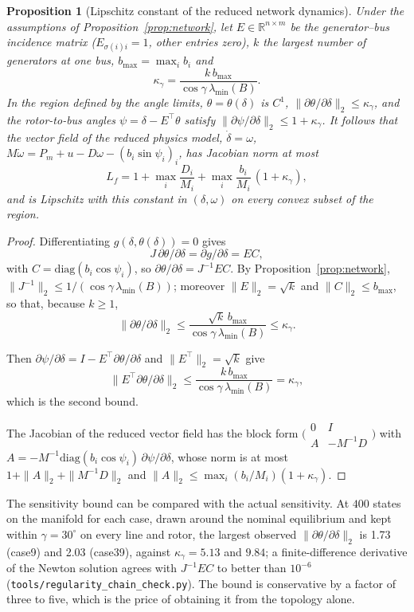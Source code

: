 \documentclass[preprint,12pt]{elsarticle}
\newtheorem{proposition}{Proposition}
\newcommand{\RR}{\mathbb{R}}
\newcommand{\chainA}{1.73}
\newcommand{\chainB}{2.03}
\newcommand{\chainC}{5.13}
\newcommand{\chainD}{9.84}
\begin{document}
\begin{proposition}[Lipschitz constant of the reduced network dynamics]
\label{prop:lip}
Under the assumptions of Proposition~\ref{prop:network}, let $E\in\RR^{n\times m}$ be the generator--bus incidence matrix ($E_{\sigma(i)i}=1$, other entries zero), $k$ the largest number of generators at one bus, $b_{\max}=\max_i b_i$ and
\begin{equation}
\kappa_\gamma=\frac{k\,b_{\max}}{\cos\gamma\,\lambda_{\min}(B)} .
\label{eq:kappa}
\end{equation}
In the region defined by the angle limits, $\theta=\theta(\delta)$ is $C^1$, $\|\partial\theta/\partial\delta\|_2\le\kappa_\gamma$, and the rotor-to-bus angles $\psi=\delta-E^\top\theta$ satisfy $\|\partial\psi/\partial\delta\|_2\le1+\kappa_\gamma$. It follows that the vector field of the reduced physics model, $\dot\delta=\omega$, $M\dot\omega=P_m+u-D\omega-(b_i\sin\psi_i)_i$, has Jacobian norm at most
\begin{equation}
L_f=1+\max_i\frac{D_i}{M_i}+\max_i\frac{b_i}{M_i}\,(1+\kappa_\gamma),
\label{eq:Lf}
\end{equation}
and is Lipschitz with this constant in $(\delta,\omega)$ on every convex subset of the region.
\end{proposition}
\begin{proof}
Differentiating $g(\delta,\theta(\delta))=0$ gives
\[J\,\partial\theta/\partial\delta=\partial g/\partial\delta=EC,\]
with $C=\mathrm{diag}(b_i\cos\psi_i)$, so $\partial\theta/\partial\delta=J^{-1}EC$. By Proposition~\ref{prop:network}, $\|J^{-1}\|_2\le1/(\cos\gamma\,\lambda_{\min}(B))$; moreover $\|E\|_2=\sqrt k$ and $\|C\|_2\le b_{\max}$, so that, because $k\ge1$,
\[\|\partial\theta/\partial\delta\|_2\le\frac{\sqrt k\,b_{\max}}{\cos\gamma\,\lambda_{\min}(B)}\le\kappa_\gamma .\]

Then $\partial\psi/\partial\delta=I-E^\top\partial\theta/\partial\delta$ and $\|E^\top\|_2=\sqrt k$ give
\[\|E^\top\partial\theta/\partial\delta\|_2\le\frac{k\,b_{\max}}{\cos\gamma\,\lambda_{\min}(B)}=\kappa_\gamma ,\]
which is the second bound.

The Jacobian of the reduced vector field has the block form $\bigl(\begin{smallmatrix}0&I\\A&-M^{-1}D\end{smallmatrix}\bigr)$ with $A=-M^{-1}\mathrm{diag}(b_i\cos\psi_i)\,\partial\psi/\partial\delta$, whose norm is at most $1+\|A\|_2+\|M^{-1}D\|_2$ and $\|A\|_2\le\max_i(b_i/M_i)(1+\kappa_\gamma)$.
\end{proof}
The sensitivity bound can be compared with the actual sensitivity. At $400$ states on the manifold for each case, drawn around the nominal equilibrium and kept within $\gamma=30^\circ$ on every line and rotor, the largest observed $\|\partial\theta/\partial\delta\|_2$ is \chainA{} (case9) and \chainB{} (case39), against $\kappa_\gamma=\chainC{}$ and $\chainD{}$; a finite-difference derivative of the Newton solution agrees with $J^{-1}EC$ to better than $10^{-6}$ (\texttt{tools/regularity\_chain\_check.py}). The bound is conservative by a factor of three to five, which is the price of obtaining it from the topology alone.
\end{document}
